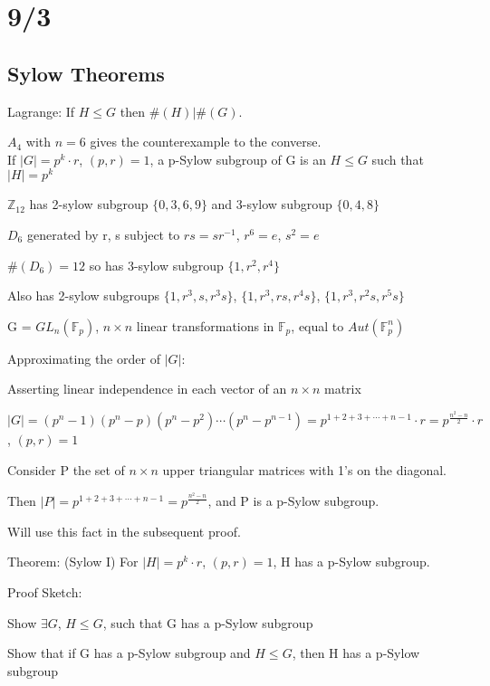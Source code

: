 \documentclass[12pt]{article}
\begin{document}
\section{9/3}

\subsection{Sylow Theorems}

Lagrange: If $H \leq G$ then $\#(H)|\#(G)$.

$A_4$ with $n = 6$ gives the counterexample to the converse.\\

\noindent
If $|G| = p^k \cdot r$, $(p, r) = 1$, a p-Sylow subgroup of G is an $H \leq G$ such that $|H| = p^k$

\noindent
$\mathds{Z}_{12}$ has 2-sylow subgroup $\{0, 3, 6, 9\}$ and 3-sylow subgroup $\{0, 4, 8\}$

\noindent
$D_6$ generated by r, s subject to $rs = sr^{-1}$, $r^6 = e$, $s^2 = e$

$\#(D_6) = 12$ so has 3-sylow subgroup $\{1, r^2, r^4\}$

Also has 2-sylow subgroups $\{1, r^3, s, r^3s\}$, $\{1, r^3, rs, r^4s\}$, $\{1, r^3, r^2s, r^5s\}$

\noindent
G = $GL_n(\mathds{F}_p)$, $n \times n$ linear transformations in $\mathds{F}_p$, equal to $Aut(\mathds{F}_p^n)$

\noindent
Approximating the order of $|G|$:  

Asserting linear independence in each vector of an $n \times n$ matrix

$|G| = (p^n - 1)(p^n-p)(p^n-p^2)\cdots(p^n-p^{n-1}) = p^{1 + 2 + 3 + \cdots + n - 1}\cdot r = p^{\frac{n^2 - n}{2}} \cdot r$, $(p, r) = 1$

Consider P the set of $n \times n$ upper triangular matrices with 1's on the diagonal.

Then $|P| = p^{1 + 2 + 3 + \cdots + n - 1} = p^{\frac{n^2 - n}{2}}$, and P is a p-Sylow subgroup.

Will use this fact in the subsequent proof.

\noindent
Theorem: (Sylow I) For $|H| = p^k \cdot r$, $(p, r) = 1$, H has a p-Sylow subgroup.

\noindent
Proof Sketch:

Show $\exists G$, $H \leq G$, such that G has a p-Sylow subgroup

Show that if G has a p-Sylow subgroup and $H \leq G$, then H has a p-Sylow subgroup
\end{document}
